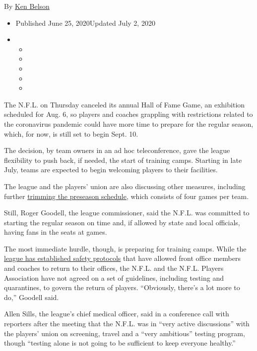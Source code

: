 By \href{https://www.nytimes3xbfgragh.onion/by/ken-belson}{Ken Belson}

\begin{itemize}
\item
  Published June 25, 2020Updated July 2, 2020
\item
  \begin{itemize}
  \item
  \item
  \item
  \item
  \item
  \end{itemize}
\end{itemize}

The N.F.L. on Thursday canceled its annual Hall of Fame Game, an
exhibition scheduled for Aug. 6, so players and coaches grappling with
restrictions related to the coronavirus pandemic could have more time to
prepare for the regular season, which, for now, is still set to begin
Sept. 10.

The decision, by team owners in an ad hoc teleconference, gave the
league flexibility to push back, if needed, the start of training camps.
Starting in late July, teams are expected to begin welcoming players to
their facilities.

The league and the players' union are also discussing other measures,
including further
\href{https://www.nytimes3xbfgragh.onion/2020/07/02/sports/football/nfl-preseason-schedule.html}{trimming
the preseason schedule}, which consists of four games per team.

Still, Roger Goodell, the league commissioner, said the N.F.L. was
committed to starting the regular season on time and, if allowed by
state and local officials, having fans in the seats at games.

The most immediate hurdle, though, is preparing for training camps.
While the
\href{https://www.nytimes3xbfgragh.onion/2020/06/08/sports/football/coronavirus-nfl-union.html}{league
has established safety protocols} that have allowed front office members
and coaches to return to their offices, the N.F.L. and the N.F.L.
Players Association have not agreed on a set of guidelines, including
testing and quarantines, to govern the return of players. ``Obviously,
there's a lot more to do,'' Goodell said.

Allen Sills, the league's chief medical officer, said in a conference
call with reporters after the meeting that the N.F.L. was in ``very
active discussions'' with the players' union on screening, travel and a
``very ambitious'' testing program, though ``testing alone is not going
to be sufficient to keep everyone healthy.''

